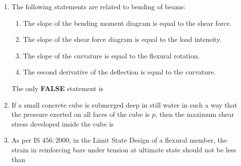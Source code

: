 \documentclass[journal]{IEEEtran}
\begin{document}
\begin{enumerate}
\item The following statements are related to bending of beams: \hfill {}
\begin{enumerate}
\item The slope of the bending moment diagram is equal to the shear force.
\item The slope of the shear force diagram is equal to the load intensity.
\item The slope of the curvature is equal to the flexural rotation.
\item The second derivative of the deflection is equal to the curvature.
\end{enumerate}
The only \textbf{FALSE} statement is
\begin{enumerate}
\end{enumerate}

\item If a small concrete cube is submerged deep in still water in such a way that the pressure exerted on all faces of the cube is $p$, then the maximum shear stress developed inside the cube is \hfill {}
\begin{enumerate}
\end{enumerate}

\item As per IS $456:2000$, in the Limit State Design of a flexural member, the strain in reinforcing bars under tension at ultimate state should not be less than \hfill {}
\begin{enumerate}
\end{enumerate}


\end{enumerate}
\end{document}
